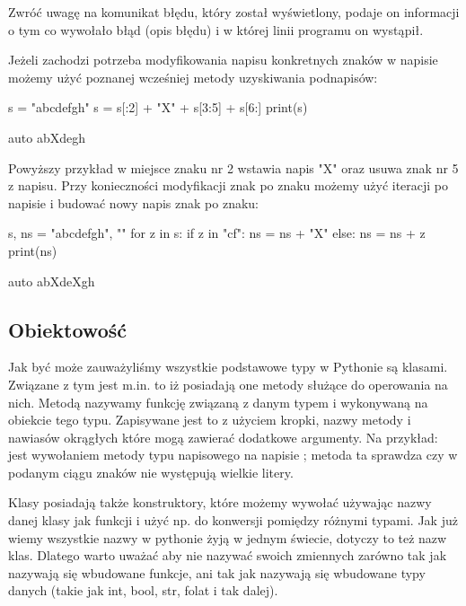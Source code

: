 Zwróć uwagę na komunikat błędu, który został wyświetlony, podaje on informacji o tym co wywołało błąd (opis błędu) i w  której linii programu on wystąpił.

Jeżeli zachodzi potrzeba modyfikowania napisu konkretnych znaków w napisie możemy użyć poznanej wcześniej metody uzyskiwania podnapisów:

\begin{CodeFrame}[python]{0.50\textwidth}
s = "abcdefgh"
s = s[:2] + "X" + s[3:5] + s[6:]
print(s)
\end{CodeFrame}
\begin{CodeFrame}{auto}
abXdegh
\end{CodeFrame}

Powyższy przykład w miejsce znaku nr 2 wstawia napis "X" oraz usuwa znak nr 5 z napisu.
Przy konieczności modyfikacji znak po znaku możemy użyć iteracji po napisie i budować nowy napis znak po znaku:

\begin{CodeFrame}[python]{0.50\textwidth}
s, ns = "abcdefgh", ""
for z in s:
    if z in "cf":
        ns = ns + "X"
    else:
        ns = ns + z
print(ns)
\end{CodeFrame}
\begin{CodeFrame}{auto}
abXdeXgh
\end{CodeFrame}

\subsection{Obiektowość}

Jak być może zauważyliśmy wszystkie podstawowe typy w Pythonie są klasami. Związane z tym jest m.in. to iż posiadają one metody służące do operowania na nich.
Metodą nazywamy funkcję związaną z danym typem i wykonywaną na obiekcie tego typu.
Zapisywane jest to z użyciem kropki, nazwy metody i nawiasów okrągłych które mogą zawierać dodatkowe argumenty.
Na przykład:  jest wywołaniem metody  typu napisowego na napisie ; metoda ta sprawdza czy w podanym ciągu znaków nie występują wielkie litery.

Klasy posiadają także konstruktory, które możemy wywołać używając nazwy danej klasy jak funkcji i użyć np. do konwersji pomiędzy różnymi typami.
Jak już wiemy wszystkie nazwy w pythonie żyją w jednym świecie, dotyczy to też nazw klas.
Dlatego warto uważać aby nie nazywać swoich zmiennych zarówno tak jak nazywają się wbudowane funkcje, ani tak jak nazywają się wbudowane typy danych (takie jak int, bool, str, folat i tak dalej).

